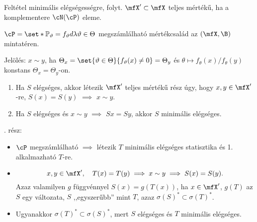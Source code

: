 \documentclass[aspectratio=169,notheorems,9pt,\option]{beamer}
\begin{document}
\begin{frame}{Feltétel minimális elégségességre, folyt.}
  $\mfX'\subset\mfX$ teljes mértékű, ha a komplementere $\cN(\cP)$ eleme.
  \begin{theorem} $\cP=\set*{\P[\theta]=f_\theta d\lambda}{\theta\in\Theta}$ megszámlálható
     mértékcsalád az $(\mfX,\B)$ mintatéren.
     
     Jelölés: $x\sim y$, ha $\Theta_x=\set{\theta\in\Theta}{f_\theta(x)\neq0}=\Theta_y$ és 
     $\theta\mapsto f_\theta(x)/f_{\theta}(y)$ konstans $\Theta_x=\Theta_y$-on.
    \begin{enumerate}[<*>]
      \item Ha $S$ elégséges, akkor létezik $\mfX'$ teljes mértékű rész úgy, 
      hogy $x,y\in\mfX'$-re, $S(x)=S(y)$ $\implies$  $x\sim y$.
      \item Ha $S$ elégséges és $x\sim y$ $\implies$ $Sx=Sy$, akkor $S$ minimális elégséges. 
    \end{enumerate}
  \end{theorem}
  . rész:
  \begin{itemize}
    \item %
    $\cP$ megszámlálható $\implies$ 
    létezik $T$ minimális elégséges statisztika és 1. alkalmazható $T$-re.
    
    \item %
    \begin{displaymath}
      x,y\in\mfX',\quad T(x)=T(y)
      \implies %
      x\sim y
      \implies
      S(x)=S(y).
    \end{displaymath}
    Azaz valamilyen $g$ függvénnyel $S(x)=g(T(x))$, ha $x\in\mfX'$, $g(T)$ az $S$ egy változata,
    $S$ ,,egyszerűbb'' mint $T$, azaz $\sigma(S)^*\subset\sigma(T)^*$.
    \item Ugyanakkor $\sigma(T)^*\subset\sigma(S)^*$, mert $S$ 
    elégséges és $T$ minimális elégséges.
  \end{itemize}
\end{frame}
\end{document}

